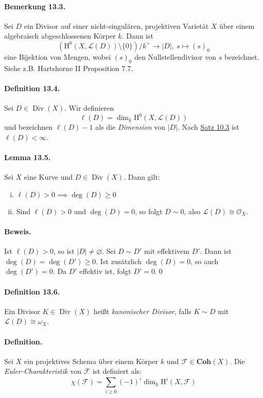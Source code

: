 \paragraph{Bemerkung 13.3.}\label{13.3} Sei $D$ ein Divisor auf einer nicht-singulären, projektiven Varietät $X$ über einem algebraisch abgeschlossenen Körper $k$. Dann ist
\[(\mathrm{H}^0(X,\mathcal{L}(D))\setminus\{0\})/k^\times\to |D|,\ s\mapsto (s)_0 \]
eine Bijektion von Mengen, wobei $(s)_0$ den Nullstellendivisor von $s$ bezeichnet. Siehe z.B. Hartshorne II Proposition 7.7.

\paragraph{Definition 13.4.}\label{13.4} Sei $D\in\operatorname{Div}(X)$. Wir definieren
\[\ell(D)=\dim_k\mathrm{H}^0(X,\mathcal{L}(D)) \]
und bezeichnen $\ell(D)-1$ als die \textit{Dimension} von $|D|$. Nach \hyperref[10.3]{Satz 10.3} ist $\ell(D)<\infty$.

\paragraph{Lemma 13.5.}\label{13.5} Sei $X$ eine Kurve und $D\in\operatorname{Div}(X)$. Dann gilt:
\begin{enumerate}[(i)]
\item $\ell(D)>0\implies\deg(D)\geq 0$
\item Sind $\ell(D)>0$ und $\deg(D)=0$, so folgt $D\sim 0$, also $\mathcal{L}(D)\cong\mathcal{O}_X$.
\end{enumerate}

\paragraph{Beweis.} Ist $\ell(D)>0$, so ist $|D|\neq\varnothing$. Sei $D\sim D'$ mit effektivem $D'$. Dann ist $\deg(D)=\deg(D')\geq 0$. Ist zusätzlich $\deg(D)=0$, so auch $\deg(D')=0$. Da $D'$ effektiv ist, folgt $D'=0$.\qed

\paragraph{Definition 13.6.}\label{13.6} Ein Divisor $K\in\operatorname{Div}(X)$ heißt \textit{kanonischer Divisor}, falls $K\sim D$ mit $\mathcal{L}(D)\cong\omega_X$.

\paragraph{Definition.} Sei $X$ ein projektives Schema über einem Körper $k$ und $\mathcal{F}\in\mathbf{Coh}(X)$. Die \textit{Euler-Charakteristik} von $\mathcal{F}$ ist definiert als:
\[\chi(\mathcal{F})=\sum_{i\geq 0}(-1)^i\dim_k\mathrm{H}^i(X,\mathcal{F}) \]


